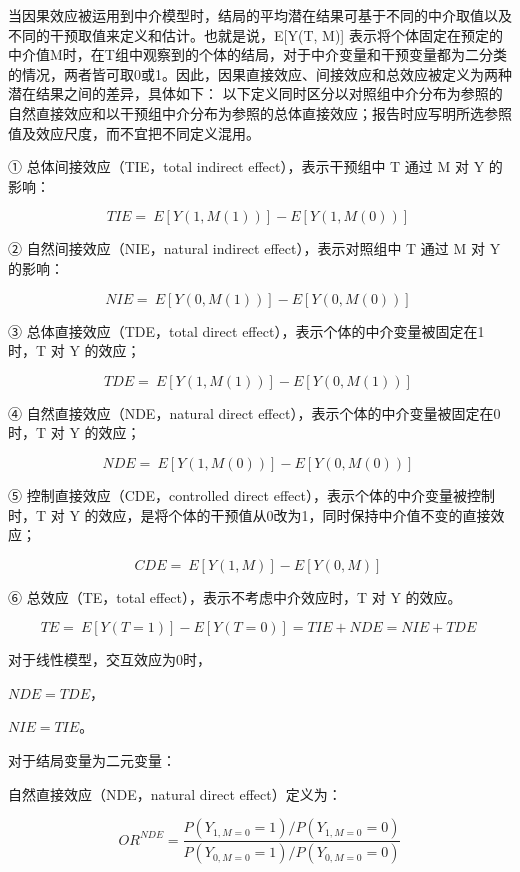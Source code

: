 \documentclass[
  chinese-hans,
  letterpaper,
  DIV=11,
  numbers=noendperiod]{scrreprt}
\begin{document}
当因果效应被运用到中介模型时，结局的平均潜在结果可基于不同的中介取值以及不同的干预取值来定义和估计。也就是说，E{[}Y(T,
M){]}
表示将个体固定在预定的中介值M时，在T组中观察到的个体的结局，对于中介变量和干预变量都为二分类的情况，两者皆可取0或1。因此，因果直接效应、间接效应和总效应被定义为两种潜在结果之间的差异，具体如下：
以下定义同时区分以对照组中介分布为参照的自然直接效应和以干预组中介分布为参照的总体直接效应；报告时应写明所选参照值及效应尺度，而不宜把不同定义混用。

① 总体间接效应（TIE，total indirect effect），表示干预组中 T 通过 M 对 Y
的影响：

\[TIE = \ E\left\lbrack Y\left( 1,M(1) \right) \right\rbrack - E\left\lbrack Y\left( 1,M(0) \right) \right\rbrack\ \]

② 自然间接效应（NIE，natural indirect effect），表示对照组中 T 通过 M 对
Y 的影响：

\[NIE = \ E\left\lbrack Y\left( 0,M(1) \right) \right\rbrack - E\left\lbrack Y\left( 0,M(0) \right) \right\rbrack\ \]

③ 总体直接效应（TDE，total direct
effect），表示个体的中介变量被固定在1时，T 对 Y 的效应；

\[TDE = \ E\left\lbrack Y\left( 1,M(1) \right) \right\rbrack - E\left\lbrack Y\left( 0,M(1) \right) \right\rbrack\ \]

④ 自然直接效应（NDE，natural direct
effect），表示个体的中介变量被固定在0时，T 对 Y 的效应；

\[NDE = \ E\left\lbrack Y\left( 1,M(0) \right) \right\rbrack - E\left\lbrack Y\left( 0,M(0) \right) \right\rbrack\ \]

⑤ 控制直接效应（CDE，controlled direct
effect），表示个体的中介变量被控制时，T 对 Y
的效应，是将个体的干预值从0改为1，同时保持中介值不变的直接效应；

\[CDE = \ E\left\lbrack Y(1,M) \right\rbrack - E\left\lbrack Y(0,M) \right\rbrack\ \]

⑥ 总效应（TE，total effect），表示不考虑中介效应时，T 对 Y 的效应。

\[TE = \ E\left\lbrack Y(T = 1) \right\rbrack - E\left\lbrack Y(T = 0) \right\rbrack = TIE + NDE = NIE + TDE\ \]

对于线性模型，交互效应为0时，

\(NDE = TDE\)，

\(NIE = TIE\)。

对于结局变量为二元变量：

自然直接效应（NDE，natural direct effect）定义为：

\[{OR}^{NDE} = \frac{P(Y_{1,M = 0} = 1)/P(Y_{1,M = 0} = 0)}{P(Y_{0,M = 0} = 1)/P(Y_{0,M = 0} = 0)}\]
\end{document}
